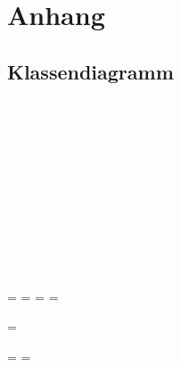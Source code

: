 \chapter{Anhang}

	\section{Klassendiagramm}
	
	
	
	
	
	\getlength{\paperwidth}\\
	\getlength{\paperheight}\\
	\getlength{\pdfpageheight}\\
	\getlength{\pdfpagewidth}\\
	\getlength{\headwidth}\\
	\getlength{\footskip}\\
	\getlength{\textwidth}\\
	\getlength{\textheight}\\
	\getlength{\vsize}\\
	\getlength{\hsize}\\
	
	\newpage
	
	\paperwidth=\pdfpageheight
	\paperheight=\pdfpagewidth
	\pdfpageheight=\paperheight
	\pdfpagewidth=\paperwidth
	\textheight
	
	\begingroup
	
	\vsize=\textwidth
	\textheight
	
	\textwidth=\hsize
	\textheight=\vsize
	
	\footskip=30pt
		
